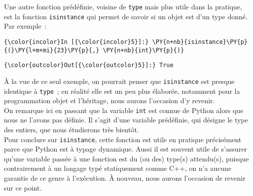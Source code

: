     Une autre fonction prédéfinie, voisine de \texttt{type} mais plus utile
dans la pratique, est la fonction \texttt{isinstance} qui permet de
savoir si un objet est d'un type donné. Par exemple~:

    \begin{Verbatim}[commandchars=\\\{\}]
{\color{incolor}In [{\color{incolor}5}]:} \PY{n+nb}{isinstance}\PY{p}{(}\PY{l+m+mi}{23}\PY{p}{,} \PY{n+nb}{int}\PY{p}{)}
\end{Verbatim}


\begin{Verbatim}[commandchars=\\\{\}]
{\color{outcolor}Out[{\color{outcolor}5}]:} True
\end{Verbatim}
            
    À la vue de ce seul exemple, on pourrait penser que \texttt{isinstance}
est presque identique à \texttt{type}~; en réalité elle est un peu plus
élaborée, notamment pour la programmation objet et l'héritage, nous
aurons l'occasion d'y revenir.\\

    On remarque ici en passant que la variable \texttt{int} est connue de
Python alors que nous ne l'avons pas définie. Il s'agit d'une variable
prédéfinie, qui désigne le type des entiers, que nous étudierons très
bientôt.\\

    Pour conclure sur \texttt{isinstance}, cette fonction est utile en
pratique précisément parce que Python est à typage dynamique. Aussi il
est souvent utile de s'assurer qu'une variable passée à une fonction est
du (ou des) type(s) attendu(s), puisque contrairement à un langage typé
statiquement comme C++, on n'a aucune garantie de ce genre à
l'exécution. À nouveau, nous aurons l'occasion de revenir sur ce point.